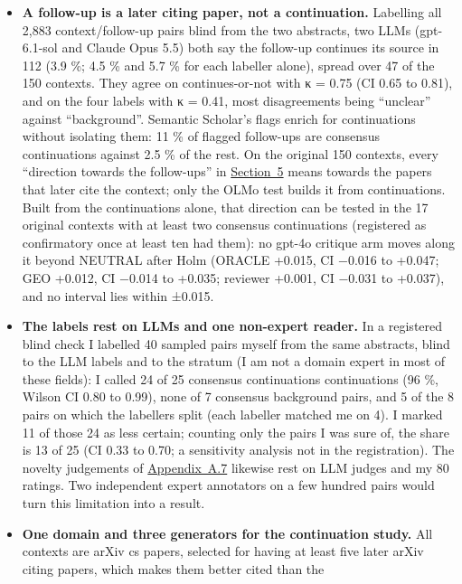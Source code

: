 \documentclass[
  10pt,
]{article}
\providecommand{\tightlist}{%
  \setlength{\itemsep}{0pt}\setlength{\parskip}{0pt}}
\begin{document}
\begin{itemize}
\tightlist
\item
  \textbf{A follow-up is a later citing
  paper, not a continuation.} Labelling
  all 2,883 context/follow-up pairs
  blind from the two abstracts, two LLMs
  (gpt-6.1-sol and Claude Opus 5.5) both
  say the follow-up continues its source
  in 112 (3.9 \%; 4.5 \% and 5.7 \% for
  each labeller alone), spread over 47
  of the 150 contexts. They agree on
  continues-or-not with κ = 0.75 (CI
  0.65 to 0.81), and on the four labels
  with κ = 0.41, most disagreements
  being ``unclear'' against
  ``background''. Semantic Scholar's
  flags enrich for continuations without
  isolating them: 11 \% of flagged
  follow-ups are consensus continuations
  against 2.5 \% of the rest. On the
  original 150 contexts, every
  ``direction towards the follow-ups''
  in \hyperref[sec:5]{Section~5} means
  towards the papers that later cite the
  context; only the OLMo test builds it
  from continuations. Built from the
  continuations alone, that direction
  can be tested in the 17 original
  contexts with at least two consensus
  continuations (registered as
  confirmatory once at least ten had
  them): no gpt-4o critique arm moves
  along it beyond NEUTRAL after Holm
  (ORACLE +0.015, CI −0.016 to +0.047;
  GEO +0.012, CI −0.014 to +0.035;
  reviewer +0.001, CI −0.031 to +0.037),
  and no interval lies within ±0.015.
\item
  \textbf{The labels rest on LLMs and
  one non-expert reader.} In a
  registered blind check I labelled 40
  sampled pairs myself from the same
  abstracts, blind to the LLM labels and
  to the stratum (I am not a domain
  expert in most of these fields): I
  called 24 of 25 consensus
  continuations continuations (96 \%,
  Wilson CI 0.80 to 0.99), none of 7
  consensus background pairs, and 5 of
  the 8 pairs on which the labellers
  split (each labeller matched me on 4).
  I marked 11 of those 24 as less
  certain; counting only the pairs I was
  sure of, the share is 13 of 25 (CI
  0.33 to 0.70; a sensitivity analysis
  not in the registration). The novelty
  judgements of
  \hyperref[app:A.7]{Appendix~A.7}
  likewise rest on LLM judges and my 80
  ratings. Two independent expert
  annotators on a few hundred pairs
  would turn this limitation into a
  result.
\item
  \textbf{One domain and three
  generators for the continuation
  study.} All contexts are arXiv cs
  papers, selected for having at least
  five later arXiv citing papers, which
  makes them better cited than the

\end{itemize}
\end{document}
